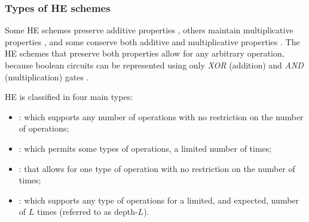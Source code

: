 \subsubsection{Types of HE schemes}

Some \gls{HE} schemes preserve additive properties \autocite{Paillier1999-js, Damgard2007-km, Damgard2009-my}, others maintain multiplicative properties \autocite{Rivest1978-mu, Elgamal1985-rk}, and some conserve both additive and multiplicative properties \autocite{Gentry2009-zv}. The \gls{HE} schemes that preserve both properties allow for any arbitrary operation, because boolean circuits can be represented using only \emph{XOR} (addition) and \emph{AND} (multiplication) gates \autocite{Acar2018-mp}. 

\gls{HE} is classified in four main types: 
\begin{itemize}
    \item \emph{}: which supports any number of operations with no restriction on the number of operations; 
    \item \emph{}: which permits some types of operations, a limited number of times;
    \item \emph{}: that allows for one type of operation with no restriction on the number of times;
    \item \emph{} \autocite{Brakerski2014-nm}: which supports any type of operations for a limited, and expected, number of $L$ times (referred to as depth-$L$).
\end{itemize}

